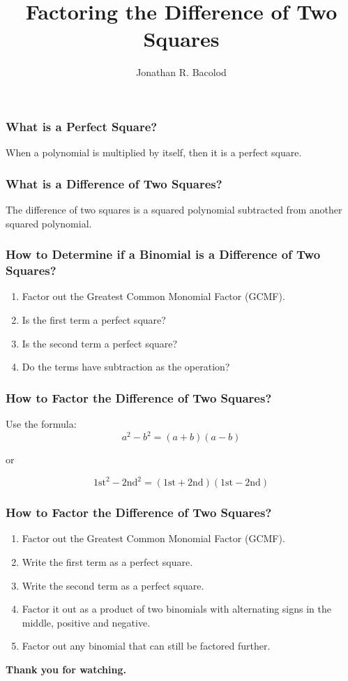 \documentclass[14pt]{beamer}
\title[Factoring the Diff. of Squares] {Factoring the Difference of Two Squares}
\author{Jonathan R. Bacolod}
\institute[SHS]{Sauyo High School}
\date{}
\begin{document}
	\frame{\titlepage}
	
	\begin{frame}
		\frametitle{What is a Perfect Square?}
		When a polynomial is multiplied by itself, then it is a perfect square.  
	\end{frame}

    \begin{frame}
    	\frametitle{What is a Difference of Two Squares?}
    	The difference of two squares is a squared polynomial subtracted from another squared polynomial.  
    \end{frame}

    \begin{frame}
    	\frametitle{How to Determine if a Binomial is a Difference of Two Squares?}
    	\begin{enumerate}
    		\item<1-> Factor out the Greatest Common Monomial Factor (GCMF).
    		\item<2-> Is the first term a perfect square?
    		\item<3-> Is the second term a perfect square?
    		\item<4-> Do the terms have subtraction as the operation?
    	\end{enumerate} 
    \end{frame}

    \begin{frame}
    	\frametitle{How to Factor the Difference of Two Squares?}
    	Use the formula:
    	\[ a^2 - b^2 = (a+b)(a-b) \]
    	\begin{center}
    		or 
    	\end{center}
        \[ \text{1st}^2 - \text{2nd}^2 = (\text{1st} + \text{2nd})(\text{1st} - \text{2nd}) \]
    
    \end{frame}

    \begin{frame}
    	\frametitle{How to Factor the Difference of Two Squares?}
    	\begin{enumerate}
    		\item<1-> Factor out the Greatest Common Monomial Factor (GCMF).
    		\item<2-> Write the first term as a perfect square.
    		\item<3-> Write the second term as a perfect square.
    		\item<4-> Factor it out as a product of two binomials with alternating signs in the middle, positive and negative.
    		\item<5-> Factor out any binomial that can still be factored further.
    	\end{enumerate} 
    \end{frame}

    \begin{frame}
    	\begin{center}
    		\textbf{\LARGE Thank you for watching.}
    	\end{center}
    \end{frame}
	
\end{document}
